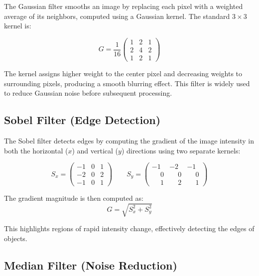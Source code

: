 \documentclass[12pt, a4paper]{article}
\begin{document}
The Gaussian filter smooths an image by replacing each pixel with a weighted average of its neighbors, computed using a Gaussian kernel. The standard $3 \times 3$ kernel is:

\begin{equation}
G = \frac{1}{16}
\begin{pmatrix}
1 & 2 & 1 \\
2 & 4 & 2 \\
1 & 2 & 1
\end{pmatrix}
\end{equation}

The kernel assigns higher weight to the center pixel and decreasing weights to surrounding pixels, producing a smooth blurring effect. This filter is widely used to reduce Gaussian noise before subsequent processing.

\subsection{Sobel Filter (Edge Detection)}

The Sobel filter detects edges by computing the gradient of the image intensity in both the horizontal ($x$) and vertical ($y$) directions using two separate kernels:

\begin{equation}
S_x = \begin{pmatrix}
-1 & 0 & 1 \\
-2 & 0 & 2 \\
-1 & 0 & 1
\end{pmatrix}
\qquad
S_y = \begin{pmatrix}
-1 & -2 & -1 \\
\phantom{-}0 & \phantom{-}0 & \phantom{-}0 \\
\phantom{-}1 & \phantom{-}2 & \phantom{-}1
\end{pmatrix}
\end{equation}

The gradient magnitude is then computed as:
\begin{equation}
G = \sqrt{S_x^2 + S_y^2}
\end{equation}

This highlights regions of rapid intensity change, effectively detecting the edges of objects.

\subsection{Median Filter (Noise Reduction)}
\end{document}
